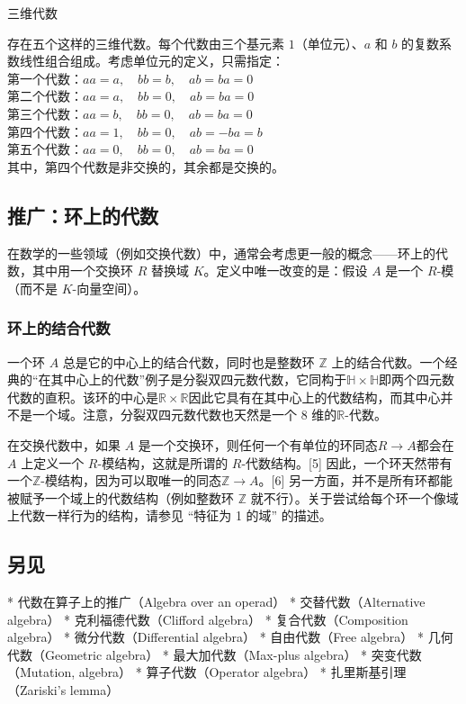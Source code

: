 三维代数

存在五个这样的三维代数。每个代数由三个基元素 $1$（单位元）、$a$ 和 $b$ 的复数系数线性组合组成。考虑单位元的定义，只需指定：\\
第一个代数：$a a = a, \quad b b = b, \quad a b = b a = 0$\\
第二个代数：$a a = a, \quad b b = 0, \quad a b = b a = 0$\\
第三个代数：$a a = b, \quad b b = 0, \quad a b = b a = 0$\\
第四个代数：$a a = 1, \quad b b = 0, \quad a b = - b a = b$\\
第五个代数：$a a = 0, \quad b b = 0, \quad a b = b a = 0$\\
其中，第四个代数是非交换的，其余都是交换的。
\subsection{推广：环上的代数}

在数学的一些领域（例如交换代数）中，通常会考虑更一般的概念——环上的代数，其中用一个交换环 $R$ 替换域 $K$。定义中唯一改变的是：假设 $A$ 是一个 $R$-模（而不是 $K$-向量空间）。
\subsubsection{环上的结合代数}
一个环 $A$ 总是它的中心上的结合代数，同时也是整数环 $\mathbb{Z}$ 上的结合代数。一个经典的“在其中心上的代数”例子是分裂双四元数代数，它同构于$\mathbb{H} \times \mathbb{H}$即两个四元数代数的直积。该环的中心是$\mathbb{R} \times \mathbb{R}$因此它具有在其中心上的代数结构，而其中心并不是一个域。注意，分裂双四元数代数也天然是一个 8 维的$\mathbb{R}$-代数。

在交换代数中，如果 $A$ 是一个交换环，则任何一个有单位的环同态$R \to A$都会在 $A$ 上定义一个 $R$-模结构，这就是所谓的 $R$-代数结构。[5] 因此，一个环天然带有一个$\mathbb{Z}$-模结构，因为可以取唯一的同态$\mathbb{Z} \to A$。[6]  另一方面，并不是所有环都能被赋予一个域上的代数结构（例如整数环 \(\mathbb{Z}\) 就不行）。关于尝试给每个环一个像域上代数一样行为的结构，请参见 “特征为 1 的域” 的描述。
\subsection{另见}

* 代数在算子上的推广（Algebra over an operad）
* 交替代数（Alternative algebra）
* 克利福德代数（Clifford algebra）
* 复合代数（Composition algebra）
* 微分代数（Differential algebra）
* 自由代数（Free algebra）
* 几何代数（Geometric algebra）
* 最大加代数（Max-plus algebra）
* 突变代数（Mutation, algebra）
* 算子代数（Operator algebra）
* 扎里斯基引理（Zariski's lemma）

